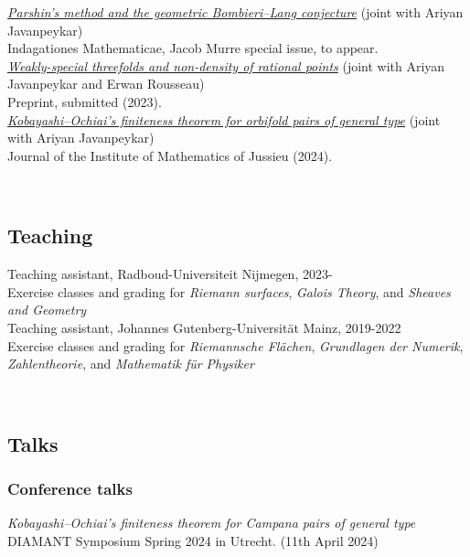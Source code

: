 \documentclass[paper=a4,fontsize=11pt,DIV=11,BCOR=3mm,pdftex]{scrartcl}
\begin{document}
\href{https://doi.org/10.1016/j.indag.2024.10.005}{\textit{Parshin's method and the geometric Bombieri--Lang conjecture}} (joint with Ariyan Javanpeykar) \\
Indagationes Mathematicae, Jacob Murre special issue, to appear. \\

\href{https://arxiv.org/abs/2310.09065}{\textit{Weakly-special threefolds and non-density of rational points}} (joint with Ariyan Javanpeykar and Erwan Rousseau) \\
Preprint, submitted (2023). \\

\href{https://doi.org/10.1017/S1474748024000094}{\textit{Kobayashi--Ochiai's finiteness theorem for orbifold pairs of general type}} (joint with Ariyan Javanpeykar) \\
Journal of the Institute of Mathematics of Jussieu (2024).

~\par


\subsection*{Teaching}
Teaching assistant, Radboud-Universiteit Nijmegen, 2023- \\
Exercise classes and grading for \textit{Riemann surfaces}, \textit{Galois Theory}, and \textit{Sheaves and Geometry} \\

Teaching assistant, Johannes Gutenberg-Universität Mainz, 2019-2022 \\
Exercise classes and grading for \textit{Riemannsche Flächen}, \textit{Grundlagen der Numerik}, \textit{Zahlentheorie}, and \textit{Mathematik für Physiker} \medskip \par


~\par

\subsection*{Talks}

\subsubsection*{Conference talks}

\textit{Kobayashi--Ochiai’s finiteness theorem for Campana pairs of general type} \\
DIAMANT Symposium Spring 2024 in Utrecht. (11th April 2024)
\end{document}
